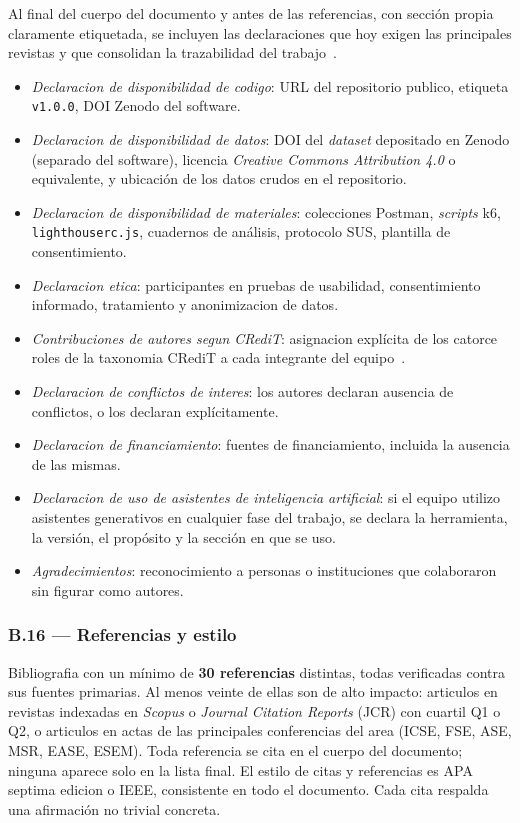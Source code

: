 \documentclass[11pt,a4paper]{article}
\begin{document}
Al final del cuerpo del documento y antes de las referencias, con secci\'{o}n propia claramente etiquetada, se incluyen las declaraciones que hoy exigen las principales revistas y que consolidan la trazabilidad del trabajo~\cite{simera2010catalogue,niso2022credit,druskat2021cff}.

\begin{itemize}
    \item \emph{Declaracion de disponibilidad de codigo}: URL del repositorio publico, etiqueta \texttt{v1.0.0}, DOI Zenodo del software.
    \item \emph{Declaracion de disponibilidad de datos}: DOI del \emph{dataset} depositado en Zenodo (separado del software), licencia \emph{Creative Commons Attribution 4.0} o equivalente, y ubicaci\'{o}n de los datos crudos en el repositorio.
    \item \emph{Declaracion de disponibilidad de materiales}: colecciones Postman, \emph{scripts} k6, \texttt{lighthouserc.js}, cuadernos de an\'{a}lisis, protocolo SUS, plantilla de consentimiento.
    \item \emph{Declaracion etica}: participantes en pruebas de usabilidad, consentimiento informado, tratamiento y anonimizacion de datos.
    \item \emph{Contribuciones de autores segun CRediT}: asignacion expl\'{i}cita de los catorce roles de la taxonomia CRediT a cada integrante del equipo~\cite{niso2022credit}.
    \item \emph{Declaracion de conflictos de interes}: los autores declaran ausencia de conflictos, o los declaran expl\'{i}citamente.
    \item \emph{Declaracion de financiamiento}: fuentes de financiamiento, incluida la ausencia de las mismas.
    \item \emph{Declaracion de uso de asistentes de inteligencia artificial}: si el equipo utilizo asistentes generativos en cualquier fase del trabajo, se declara la herramienta, la versi\'{o}n, el prop\'{o}sito y la secci\'{o}n en que se uso.
    \item \emph{Agradecimientos}: reconocimiento a personas o instituciones que colaboraron sin figurar como autores.
\end{itemize}

\subsubsection*{B.16 --- Referencias y estilo}

Bibliografia con un m\'{i}nimo de \textbf{30 referencias} distintas, todas verificadas contra sus fuentes primarias. Al menos veinte de ellas son de alto impacto: articulos en revistas indexadas en \emph{Scopus} o \emph{Journal Citation Reports} (JCR) con cuartil Q1 o Q2, o articulos en actas de las principales conferencias del area (ICSE, FSE, ASE, MSR, EASE, ESEM). Toda referencia se cita en el cuerpo del documento; ninguna aparece solo en la lista final. El estilo de citas y referencias es APA septima edicion o IEEE, consistente en todo el documento. Cada cita respalda una afirmaci\'{o}n no trivial concreta.
\end{document}
